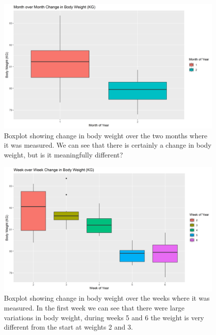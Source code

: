 \documentclass[journal, a4paper]{IEEEtran}
\begin{document}
\begin{figure}[h!]
	\includegraphics[width=\linewidth]{../plots/02_bw_vs_mnth.png}
	\caption{Boxplot showing change in body weight over the two months where it was measured. We can see that there is certainly a change in body weight, but is
	it meaningfully different?}
	\label{fig:2}
\end{figure}

\begin{figure}[h!]
	\includegraphics[width=\linewidth]{../plots/03_bw_vs_wk.png}
	\caption{Boxplot showing change in body weight over the weeks where it was measured. In the first week we can see that there were large variations in body
	weight, during weeks 5 and 6 the weight is very different from the start at weights 2 and 3.}
	\label{fig:3}
\end{figure}
\end{document}
